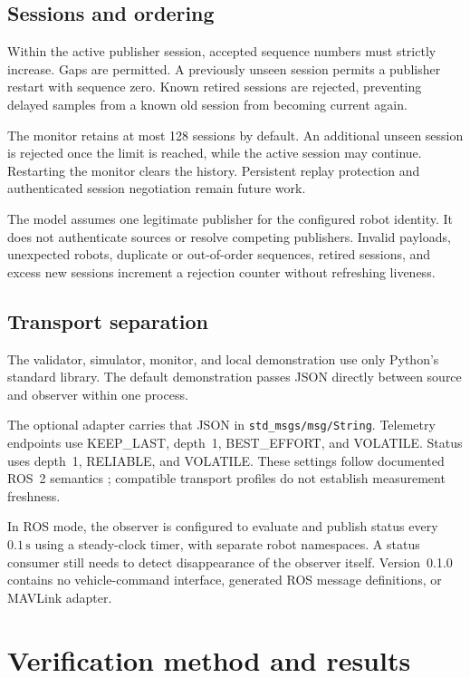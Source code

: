 \documentclass[11pt,a4paper]{article}
\newcommand{\code}[1]{\texttt{#1}}
\begin{document}
\subsection{Sessions and ordering}
Within the active publisher session, accepted sequence numbers must strictly
increase. Gaps are permitted. A previously unseen session permits a publisher
restart with sequence zero. Known retired sessions are rejected, preventing
delayed samples from a known old session from becoming current again.

The monitor retains at most 128 sessions by default. An additional unseen session
is rejected once the limit is reached, while the active session may continue.
Restarting the monitor clears the history. Persistent replay protection and
authenticated session negotiation remain future work.

The model assumes one legitimate publisher for the configured robot identity.
It does not authenticate sources or resolve competing publishers. Invalid
payloads, unexpected robots, duplicate or out-of-order sequences, retired sessions,
and excess new sessions increment a rejection counter without refreshing liveness.

\subsection{Transport separation}
The validator, simulator, monitor, and local demonstration use only Python's
standard library. The default demonstration passes JSON directly between source
and observer within one process.

The optional adapter carries that JSON in \code{std\_msgs/msg/String}.
Telemetry endpoints use KEEP\_LAST, depth~1, BEST\_EFFORT, and VOLATILE.
Status uses depth~1, RELIABLE, and VOLATILE. These settings follow documented
ROS~2 semantics \cite{ros_qos}; compatible transport profiles do not establish
measurement freshness.

In ROS mode, the observer is configured to evaluate and publish status every
$0.1\,\mathrm{s}$ using a steady-clock timer, with separate robot namespaces.
A status consumer still needs to detect disappearance of the observer itself.
Version~0.1.0 contains no vehicle-command interface, generated ROS message
definitions, or MAVLink adapter.

\section{Verification method and results}
\end{document}
